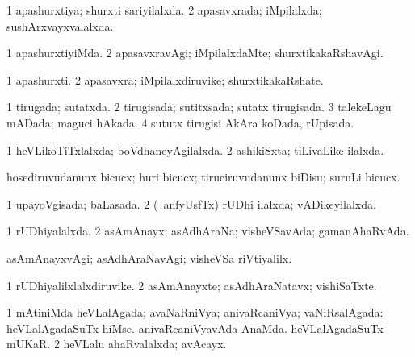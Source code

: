 \bentry
{} 
\gl{\gu}
\expl{}
\bmng
\bnum
\num{1} apashurxtiya; shurxti sariyilalxda. 
\num{2} apasavxrada; iMpilalxda; sushArxvayxvalalxda. 
\enum
\emng
\eentry

\bentry 
{} 
\gl{\kirxvi}
\expl{}
\bmng
\bnum
\num{1} apashurxtiyiMda. 
\num{2} apasavxravAgi; iMpilalxdaMte; shurxtikakaRshavAgi. 
\enum
\emng
\eentry

\bentry
{} 
\gl{\nA}
\expl{}
\bmng
\bnum
\num{1} apashurxti. 
\num{2} apasavxra; iMpilalxdiruvike; shurxtikakaRshate. 
\enum
\emng
\eentry

\bentry
{} 
\gl{\gu}
\expl{}
\bmng
\bnum
\num{1} tirugada; sutatxda. 
\num{2} tirugisada; sutitxsada; sutatx tirugisada. 
\num{3} talekeLagu mADada; maguci hAkada. 
\num{4} sututx tirugisi AkAra koDada, rUpisada. 
\enum
\emng
\eentry

\bentry
{} 
\gl{\gu}
\expl{}
\bmng
\bnum
\num{1} heVLikoTiTxlalxda; boVdhaneyAgilalxda. 
\num{2} ashikiSxta; tiLivaLike ilalxda. 
\enum
\emng
\eentry

\bentry
{} 
\gl{\sakirx}
\expl{}
\bmng
hosediruvudanunx bicucx; huri bicucx; tiruciruvudanunx biDisu; suruLi bicucx. 
\emng
\eentry

\bentry
{} 
\gl{\gu}
\expl{}
\bmng
\bnum
\num{1} upayoVgisada; baLasada. 
\num{2} (\ucAcx\ anfyUsfTx) rUDhi ilalxda; vADikeyilalxda. 
\enum
\emng
\eentry

\bentry
{} 
\gl{\gu}
\expl{}
\bmng
\bnum
\num{1} rUDhiyalalxda. 
\num{2} asAmAnayx; asAdhAraNa; visheVSavAda; gamanAhaRvAda. 
\enum
\emng
\eentry

\bentry
{} 
\gl{\kirxvi}
\expl{}
\bmng
asAmAnayxvAgi; asAdhAraNavAgi; visheVSa riVtiyalilx. 
\emng
\eentry

\bentry
{} 
\gl{\nA}
\expl{}
\bmng
\bnum
\num{1} rUDhiyalilxlalxdiruvike. 
\num{2} asAmAnayxte; asAdhAraNatavx; vishiSaTxte. 
\enum
\emng
\eentry

\bentry
{} 
\gl{\gu}
\expl{}
\bmng
\bnum
\num{1} mAtiniMda heVLalAgada; avaNaRniVya; anivaRcaniVya; vaNiRsalAgada:  heVLalAgadaSuTx hiMse.  anivaRcaniVyavAda AnaMda.  heVLalAgadaSuTx mUKaR. 
\num{2} heVLalu ahaRvalalxda; avAcayx. 
\enum
\emng
\eentry

